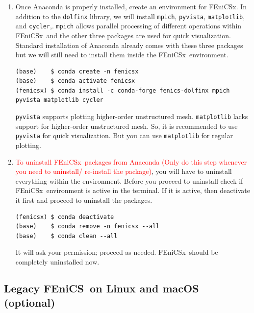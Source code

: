 \documentclass[12pt]{article}
\newcommand{\fenics}{\textsf{FEniCS}}
\newcommand{\fenicsx}{\textsf{FEniCSx}}
\begin{document}
\begin{enumerate}[label={\arabic*.}, leftmargin= 0.6 cm,itemsep = 0.2cm,topsep=.2cm, parsep=0.2cm]

\item Once Anaconda is properly installed, create an environment for \fenicsx. In addition to the \texttt{dolfinx} library, we will install \texttt{mpich}, \texttt{pyvista}, \texttt{matplotlib}, and \texttt{cycler},. \texttt{mpich} allows parallel processing of different operations within \fenicsx \ and the other three packages are used for quick visualization. Standard installation of Anaconda already comes with these three packages but we will still need to install them inside the \fenicsx \ environment.

\begin{lstlisting}[style=terminal]
(base)    $ conda create -n fenicsx
(base)    $ conda activate fenicsx
(fenicsx) $ conda install -c conda-forge fenics-dolfinx mpich pyvista matplotlib cycler
\end{lstlisting}

\texttt{pyvista} supports plotting higher-order unstructured mesh. \texttt{matplotlib} lacks support for higher-order unstructured mesh. So, it is recommended to use \texttt{pyvista} for quick visualization. But you can use \texttt{matplotlib} for regular plotting.

\item  \textcolor{red}{To uninstall \fenicsx \ packages from Anaconda (Only do this step whenever you need to uninstall/ re-install the package)}, you will have to uninstall everything within the environment. Before you proceed to uninstall check if \fenicsx \ environment is active in the terminal. If it is active, then deactivate it first and proceed to uninstall the packages.
\begin{lstlisting}[style=terminal]
(fenicsx) $ conda deactivate
(base)    $ conda remove -n fenicsx --all
(base)    $ conda clean --all
\end{lstlisting}

It will ask your permission; proceed as needed. \fenicsx \ should be completely uninstalled now.

\end{enumerate}

\subsection*{Legacy \fenics \ on Linux and macOS (optional)}
\end{document}
